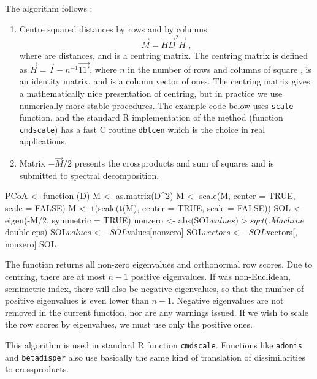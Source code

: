 The algorithm follows \citet{Mard79}:
\begin{enumerate}
  \item Centre squared distances by rows and by columns
    \begin{equation}
      \vec{M} = \vec{H D}^2 \vec{H}\;,
    \end{equation}
    where  are distances, and  is a centring matrix. The
    centring matrix is defined as $\vec{H} = \vec{I}-n^{-1}\vec{11'}$,
    where $n$ in the number of rows and columns of square ,
     is an identity matrix, and  is a column vector of
    ones.  The centring matrix gives a mathematically nice
    presentation of centring, but in practice we use numerically more
    stable procedures. The example code below uses \texttt{scale}
    function, and the standard R implementation of the method
    (function \texttt{cmdscale}) has a fast C routine \texttt{dblcen}
    which is the choice in real applications.
  \item Matrix $-\vec{M}/2$ presents the crossproducts and sum of
    squares and is submitted to spectral decomposition.
\end{enumerate}

\begin{Schunk}
\begin{Soutput}
PCoA <-
function (D) 
{
    M <- as.matrix(D^2)
    M <- scale(M, center = TRUE, scale = FALSE)
    M <- t(scale(t(M), center = TRUE, scale = FALSE))
    SOL <- eigen(-M/2, symmetric = TRUE)
    nonzero <- abs(SOL$values) > sqrt(.Machine$double.eps)
    SOL$values <- SOL$values[nonzero]
    SOL$vectors <- SOL$vectors[, nonzero]
    SOL
}
\end{Soutput}
\end{Schunk}

The function returns all non-zero eigenvalues and orthonormal row
scores. Due to centring, there are at most $n-1$ positive
eigenvalues. If  was non-Euclidean, semimetric index, there
will also be negative eigenvalues, so that the number of positive
eigenvalues is even lower than $n-1$. Negative eigenvalues are not
removed in the current function, nor are any warnings issued. If we
wish to scale the row scores by eigenvalues, we must use only the
positive ones.

This algorithm is used in standard R function \texttt{cmdscale}.
Functions like \texttt{adonis} and \texttt{betadisper} also use
basically the same kind of translation of dissimilarities to
crossproducts.

